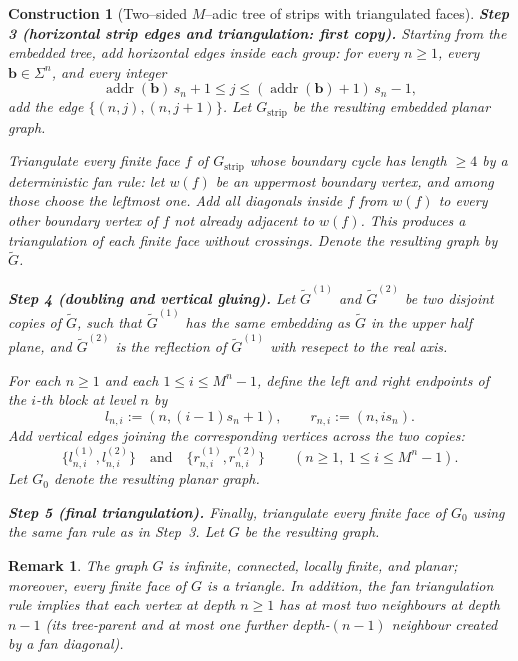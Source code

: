 \documentclass[11pt]{amsart}
\DeclareMathOperator{\addr}{addr}
\theoremstyle{plain}
\newtheorem{remark}[theorem]{Remark}
\newtheorem{construction}[theorem]{Construction}
\numberwithin{equation}{section}
\numberwithin{figure}{section}
\renewcommand\ell{l}
\begin{document}
\begin{construction}[Two--sided $M$--adic tree of strips with triangulated faces]
\smallskip
\noindent\textbf{Step 3 (horizontal strip edges and triangulation: first copy).}
Starting from the embedded tree, add \emph{horizontal} edges inside each group:
for every $n\ge 1$, every $\mathbf b\in\Sigma^n$, and every integer
\[
\addr(\mathbf b)\,s_n+1\le j\le (\addr(\mathbf b)+1)\,s_n-1,
\]
add the edge $\{(n,j),(n,j+1)\}$.
Let $G_{\mathrm{strip}}$ be the resulting embedded planar graph.

Triangulate every finite face $f$ of $G_{\mathrm{strip}}$ whose boundary cycle has length $\ge 4$
by a deterministic fan rule:
let $w(f)$ be an uppermost boundary vertex, and among those choose the \emph{leftmost} one.
Add all diagonals inside $f$ from $w(f)$ to every other boundary vertex of $f$ not already adjacent to $w(f)$.
This produces a triangulation of each finite face without crossings.
Denote the resulting graph by $\widetilde G$.

\smallskip
\noindent\textbf{Step 4 (doubling and vertical gluing).}
Let $\widetilde G^{(1)}$ and $\widetilde G^{(2)}$ be two disjoint copies of $\widetilde G$,
such that $\widetilde G^{(1)}$ has the same embedding as $\widetilde G$ in the upper half plane, and
 $\tilde{G}^{(2)}$ is the reflection of $\tilde{G}^{(1)}$ with resepect to the real axis.

For each $n\ge 1$ and each $1\le i\le M^n-1$, define the left and right endpoints of the $i$-th block at level $n$ by
\[
\ell_{n,i}:=(n,(i-1)s_n+1),
\qquad
r_{n,i}:=(n,is_n).
\]
Add \emph{vertical} edges joining the corresponding vertices across the two copies:
\[
\{\ell_{n,i}^{(1)},\ell_{n,i}^{(2)}\}
\quad\text{and}\quad
\{r_{n,i}^{(1)},r_{n,i}^{(2)}\}
\qquad (n\ge 1,\ 1\le i\le M^n-1).
\]
Let $G_0$ denote the resulting planar graph.

\smallskip
\noindent\textbf{Step 5 (final triangulation).}
Finally, triangulate every finite face of $G_0$ using the same fan rule as in Step~3. 
Let $G$ be the resulting graph.
\end{construction}

\begin{remark}\label{c75r}
The graph $G$ is infinite, connected, locally finite, and planar; moreover, every finite face of $G$ is a triangle.
In addition, the fan triangulation rule implies that each vertex at depth $n\ge1$ has at most two neighbours
at depth $n-1$ (its tree-parent and at most one further depth-$(n-1)$ neighbour created by a fan diagonal).
\end{remark}
\end{document}
